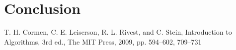 \documentclass[conference]{IEEEtran}
\begin{document}

\section{Conclusion}

\begin{thebibliography}{00}
     T. H. Cormen, C. E. Leiserson, R. L. Rivest, and C. Stein, Introduction to Algorithms, 3rd ed., The MIT Press, 2009, pp. 594--602, 709--731 
\end{thebibliography}
\end{document}
